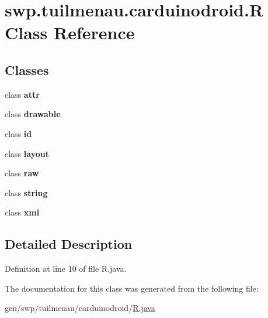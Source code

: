 \hypertarget{classswp_1_1tuilmenau_1_1carduinodroid_1_1_r}{}\section{swp.\+tuilmenau.\+carduinodroid.\+R Class Reference}
\label{classswp_1_1tuilmenau_1_1carduinodroid_1_1_r}
\subsection*{Classes}
\begin{DoxyCompactItemize}
\item 
class {\bfseries attr}
\item 
class {\bfseries drawable}
\item 
class {\bfseries id}
\item 
class {\bfseries layout}
\item 
class {\bfseries raw}
\item 
class {\bfseries string}
\item 
class {\bfseries xml}
\end{DoxyCompactItemize}


\subsection{Detailed Description}


Definition at line 10 of file R.\+java.



The documentation for this class was generated from the following file\+:\begin{DoxyCompactItemize}
\item 
gen/swp/tuilmenau/carduinodroid/\hyperlink{_r_8java}{R.\+java}\end{DoxyCompactItemize}
